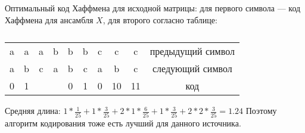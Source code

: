 \documentclass{article}
\begin{document}
Оптимальный код Хаффмена для исходной матрицы: для первого символа — код Хаффмена для ансамбля $X$, для второго согласно таблице:
\begin{table}[H]
\begin{tabular}{|c|c|c|c|c|c|c|c|c|c|}
a & a & a & b & b & b & c & c & c & предыдущий символ\\
a & b & c & a & b & c & a & b & c & следующий символ\\
0 & 1 &   &   & 0 & 1 & 0 &10 &11 & код\\
\end{tabular}
\captionsetup{singlelinecheck=off,justification=raggedright}
\caption{\label{tab:widgets}}
\end{table}
Средняя длина: $1 * \frac{1}{25} + 1 * \frac{3}{25} + 2 * 1 * \frac{6}{25} + 1 * \frac{3}{25} + 2 * 2 * \frac{3}{25} = 1.24$
Поэтому алгоритм кодирования тоже есть лучший для данного источника. 
\end{document}

